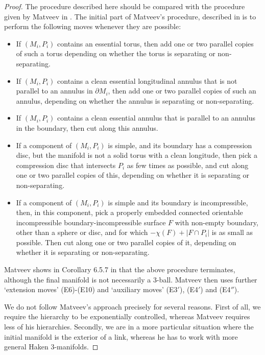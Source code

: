 \documentclass[oneside]{amsart}
\numberwithin{equation}{section}
\theoremstyle{plain}
\theoremstyle{definition}
\begin{document}
\begin{proof}
The procedure described here should be compared with the procedure given by Matveev in \cite{Matveev}. The initial part of Matveev's procedure, described in \cite[Section 6.5.1]{Matveev} is to perform the following moves whenever they are possible:
\begin{itemize}
\item[(E1)] If $(M_i, P_i)$ contains an essential torus, then add one or two parallel copies of such a torus depending on whether the torus is separating or non-separating.
\item[(E2)] If $(M_i, P_i)$ contains a clean essential longitudinal annulus that is not parallel to an annulus in $\partial M_i$, then add one or two parallel copies of such an annulus, depending on whether the annulus is separating or non-separating.
\item[(E3)] If $(M_i, P_i)$ contains a clean essential annulus that is parallel to an annulus in the boundary, then cut along this annulus.
\item[(E4)] If a component of $(M_i, P_i)$ is simple, and its boundary has a compression disc, but the manifold is not a solid torus with a clean longitude, then pick a compression disc that intersects $P_i$ as few times as possible, and cut along one or two parallel copies of this, depending on whether it is separating or non-separating.
\item[(E5)] If a component of $(M_i, P_i)$ is simple and its boundary is incompressible, then, in this component, pick a properly embedded connected orientable incompressible boundary-incompressible surface $F$ with non-empty boundary, other than a sphere or disc, and for which $-\chi(F) + |F \cap P_i|$ is as small as possible. Then cut along one or two parallel copies of it, depending on whether it is separating or non-separating.
\end{itemize}

Matveev shows in Corollary 6.5.7 in \cite{Matveev} that the above procedure terminates, although the final manifold is not necessarily a 3-ball. Matveev then uses further `extension moves' (E6)-(E10) and `auxiliary moves' (E3$'$), (E4$'$) and (E4$''$).

We do not follow Matveev's approach precisely for several reasons. First of all, we require the hierarchy to be exponentially controlled, whereas Matveev requires less of his hierarchies. Secondly, we are in a more particular situation where the initial manifold is the exterior of a link, whereas he has to work with more general Haken 3-manifolds.


\end{proof}
\end{document}
